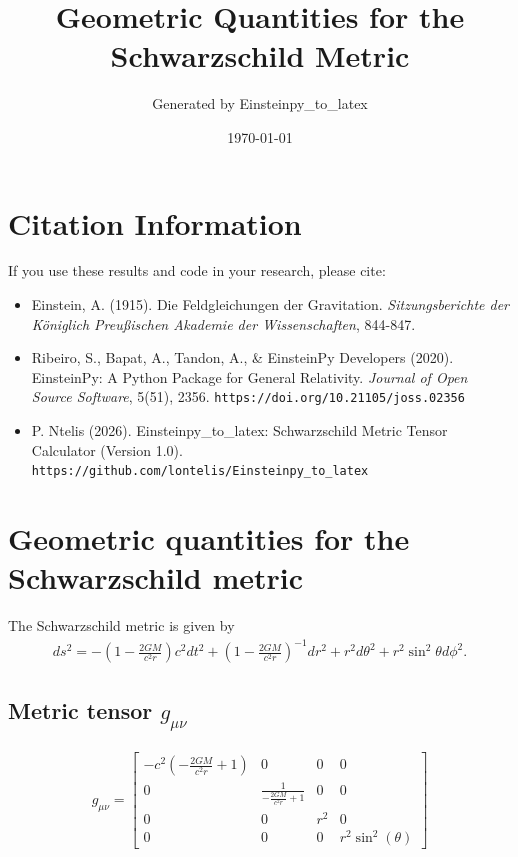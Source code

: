 \documentclass{article}
\begin{document}

\title{Geometric Quantities for the Schwarzschild Metric}
\author{Generated by Einsteinpy\_to\_latex}
\date{\today}
\maketitle

\section{Citation Information}
If you use these results and code in your research, please cite:
\begin{itemize}
\item Einstein, A. (1915). Die Feldgleichungen der Gravitation. 
      \textit{Sitzungsberichte der K\"oniglich Preu\ss ischen Akademie der Wissenschaften}, 844-847.
\item Ribeiro, S., Bapat, A., Tandon, A., \& EinsteinPy Developers (2020).
      EinsteinPy: A Python Package for General Relativity.
      \textit{Journal of Open Source Software}, 5(51), 2356.
      \texttt{https://doi.org/10.21105/joss.02356}
\item P. Ntelis (2026). Einsteinpy\_to\_latex: Schwarzschild Metric Tensor Calculator (Version 1.0).
      \texttt{https://github.com/lontelis/Einsteinpy\_to\_latex}
\end{itemize}

\section{Geometric quantities for the Schwarzschild metric}

The Schwarzschild metric is given by
\begin{align}
ds^2 = -\left(1-\frac{2GM}{c^2 r}\right) c^2 dt^2 + \left(1-\frac{2GM}{c^2 r}\right)^{-1} dr^2 + r^2 d\theta^2 + r^2 \sin^2\theta d\phi^2 .
\end{align}

\subsection{Metric tensor $g_{\mu\nu}$}
\begin{align} g_{\mu\nu}= 
\left[\begin{matrix}- c^{2} \left(- \frac{2 G M}{c^{2} r} + 1\right) & 0 & 0 & 0\\0 & \frac{1}{- \frac{2 G M}{c^{2} r} + 1} & 0 & 0\\0 & 0 & r^{2} & 0\\0 & 0 & 0 & r^{2} \sin^{2}{\left(\theta \right)}\end{matrix}\right]
\end{align}
\end{document}
